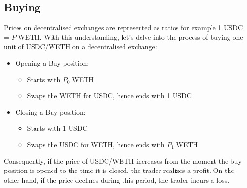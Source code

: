 \subsection{Buying}
Prices on decentralised exchanges are represented as ratios for example 1 USDC = $P$ WETH. With this understanding, let's delve into the process of buying one unit of USDC/WETH on a decentralised exchange:
\begin{itemize}
    \item Opening a Buy position:\begin{itemize}
        \item Starts with $P_{0}$ WETH
        \item Swaps the WETH for USDC, hence ends with 1 USDC
    \end{itemize}
    \item Closing a Buy position:\begin{itemize}
        \item Starts with 1 USDC
        \item Swaps the USDC for WETH, hence ends with $P_1$ WETH
    \end{itemize}
\end{itemize}
\noindent Consequently, if the price of USDC/WETH increases from the moment the buy position is opened to the time it is closed, the trader realizes a profit. On the other hand, if the price declines during this period, the trader incurs a loss.

